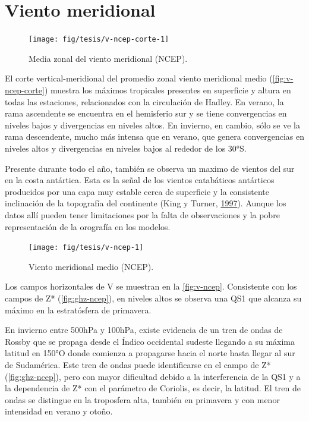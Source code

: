 \documentclass[spanish,a4paper,12pt,oneside]{book}
\begin{document}
\section{Viento meridional}\label{viento-meridional}

\begin{figure}
\texttt{[image: fig/tesis/v-ncep-corte-1]} \caption{Media zonal del viento meridional (NCEP).}\label{fig:v-ncep-corte}
\end{figure}

El corte vertical-meridional del promedio zonal viento meridional medio
(\autoref{fig:v-ncep-corte}) muestra los máximos tropicales presentes en
superficie y altura en todas las estaciones, relacionados con la
circulación de Hadley. En verano, la rama ascendente se encuentra en el
hemisferio sur y se tiene convergencias en niveles bajos y divergencias
en niveles altos. En invierno, en cambio, sólo se ve la rama
descendente, mucho más intensa que en verano, que genera convergencias
en niveles altos y divergencias en niveles bajos al rededor de los 30°S.

Presente durante todo el año, también se observa un maximo de vientos
del sur en la costa antártica. Esta es la señal de los vientos
catabáticos antárticos producidos por una capa muy estable cerca de
superficie y la consistente inclinación de la topografía del continente
(King y Turner, \protect\hyperlink{ref-King1997}{1997}). Aunque los
datos allí pueden tener limitaciones por la falta de observaciones y la
pobre representación de la orografía en los modelos.

\begin{landscape}\begin{figure}

{\centering \texttt{[image: fig/tesis/v-ncep-1]} 

}

\caption{Viento meridional medio (NCEP).}\label{fig:v-ncep}
\end{figure}
\end{landscape}

Los campos horizontales de V se muestran en la \autoref{fig:v-ncep}.
Consistente con los campos de Z* (\autoref{fig:ghz-ncep}), en niveles
altos se observa una QS1 que alcanza su máximo en la estratósfera de
primavera.

En invierno entre 500hPa y 100hPa, existe evidencia de un tren de ondas
de Rossby que se propaga desde el Índico occidental sudeste llegando a
su máxima latitud en 150°O donde comienza a propagarse hacia el norte
hasta llegar al sur de Sudamérica. Este tren de ondas puede
identificarse en el campo de Z* (\autoref{fig:ghz-ncep}), pero con mayor
dificultad debido a la interferencia de la QS1 y a la dependencia de Z*
con el parámetro de Coriolis, es decir, la latitud. El tren de ondas se
distingue en la troposfera alta, también en primavera y con menor
intensidad en verano y otoño.
\end{document}

